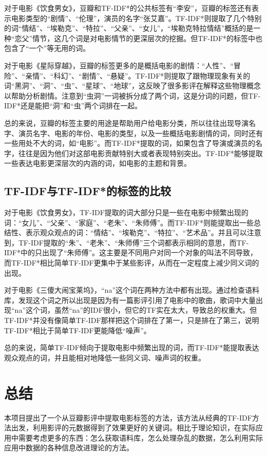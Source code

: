 \documentclass[a4paper, nofonts, nocap]{ctexart}
\begin{document}
对于电影《饮食男女》，豆瓣和TF-IDF*的公共标签有“李安”，豆瓣的标签还有表示电影类型的“剧情”、“伦理”，演员的名字“张艾嘉”。TF-IDF*则提取了几个特别的词“情结”、“埃勒克”、“特拉”、“父亲”、“女儿”，“埃勒克特拉情结”概括的是一种“恋父”情节，这几个词是对电影情节的更深层次的挖掘。但TF-IDF*的标签中也包含了“一个”等无用的词。

对于电影《星际穿越》，豆瓣的标签更多的是概括电影的剧情：“人性”、“冒险”、“亲情”、“科幻”、“剧情”、“悬疑”。TF-IDF*则提取了跟物理现象有关的词“黑洞”、“洞”、“虫”、“星球”、“地球”，这反映了很多影评在解释这些物理概念以帮助分析剧情。注意到“虫洞”一词被拆分成了两个词，这是分词的问题，但TF-IDF*还是能把“洞”和“虫”两个词排在一起。

总的来说，豆瓣的标签主要的用途是帮助用户给电影分类，所以往往出现导演名字、演员名字、电影的年份、电影的类型，以及一些概括电影剧情的词，同时还有一些用处不大的词，如“电影”。而TF-IDF*提取的词，如果包含了导演或演员的名字，往往是因为他们对这部电影贡献特别大或者表现特别突出。TF-IDF*能够提取一些表达电影更深层次的内涵的词，如电影的主题和背景。

\subsection{TF-IDF与TF-IDF*的标签的比较}
对于电影《饮食男女》，TF-IDF提取的词大部分只是一些在电影中频繁出现的词：“女儿”、“父亲”、“家庭”、“老朱”、“朱师傅”。而TF-IDF*则能提取出一些总结性、表示观众观点的词：“情结”、“埃勒克”、“特拉”、“艺术品”。并且可以注意到，TF-IDF提取的“朱”、“老朱”、“朱师傅”三个词都表示相同的意思，而TF-IDF*中的只出现了“朱师傅”。这主要是不同用户对同一个对象的叫法不同导致，而TF-IDF*相比简单TF-IDF更集中于某些影评，从而在一定程度上减少同义词的出现。

对于电影《三傻大闹宝莱坞》，“na”这个词在两种方法中都有出现。通过检查语料库，发现这个词之所以出现是因为有一篇影评引用了电影中的歌曲，歌词中大量出现“na”这个词，虽然“na”的IDF很小，但它的TF实在太大，导致总的权重大。但TF-IDF*并没有像简单TF-IDF那样把这个词排在了第一，只是排在了第三，说明TF-IDF*相比于简单TF-IDF更能降低“噪声”。

总的来说，简单TF-IDF倾向于提取电影中频繁出现的词，而TF-IDF*能提取表达观众观点的词，并且能相对地降低一些同义词、噪声词的权重。

\section{总结}
本项目提出了一个从豆瓣影评中提取电影标签的方法，该方法从经典的TF-IDF方法出发，利用影评的元数据得到了效果更好的关键词。相比于理论知识，在实际应用中需要考虑更多的东西：怎么获取语料库，怎么处理杂乱的数据，怎么利用实际应用中数据的各种信息改进理论的方法。
\end{document}
